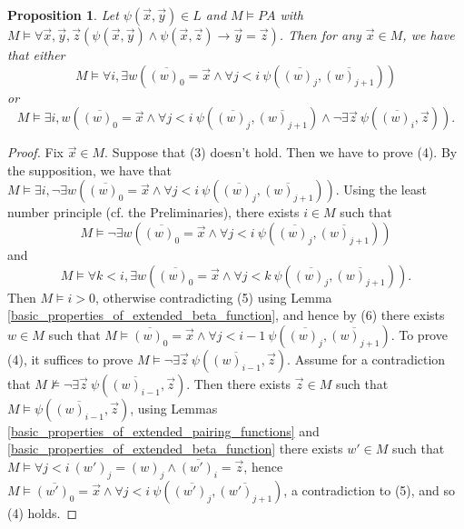 \documentclass[a4paper,11pt]{article}
\begin{document}
\newtheorem{code_recursively_generated}[X_semantics_of_while_programs]{Proposition}
\begin{code_recursively_generated}\label{code_recursively_generated_label}
Let $\psi(\vec{x},\vec{y}) \in L$ and $M\models PA$ with $M \models \forall \vec{x},\vec{y},\vec{z} (\psi(\vec{x},\vec{y}) \wedge \psi(\vec{x},\vec{z})\rightarrow \vec{y}=\vec{z})$. Then for any $\vec{x}\in M$, we have that either
\begin{equation}
  M \models \forall i, \exists w ( \overline{(w)_0} = \vec{x} \wedge \forall j<i\ \psi(\overline{(w)_j},\overline{(w)_{j+1}}) ) \tag{3}
\end{equation}
or
\begin{equation}
  M \models \exists i,w( \overline{(w)_0} = \vec{x} \wedge \forall j<i\ \psi(\overline{(w)_j},\overline{(w)_{j+1}}) \wedge \neg \exists \vec{z}\ \psi(\overline{(w)_i}, \vec{z})). \tag{4}
\end{equation}
\end{code_recursively_generated}
\begin{proof}
Fix $\vec{x}\in M$. Suppose that (3) doesn't hold. Then we have to prove (4). By the supposition, we have that $M \models \exists i, \neg\exists w ( \overline{(w)_0} = \vec{x} \wedge \forall j<i\ \psi(\overline{(w)_j},\overline{(w)_{j+1}}) )$.  Using the least number principle (cf. the Preliminaries), there exists $i\in M$ such that
\begin{equation}
  M \models \neg \exists w ( \overline{(w)_0} = \vec{x} \wedge \forall j<i\ \psi(\overline{(w)_j},\overline{(w)_{j+1}}) ) \tag{5}
\end{equation}
and
\begin{equation}
  M \models \forall k<i, \exists w ( \overline{(w)_0} = \vec{x} \wedge \forall j<k\ \psi(\overline{(w)_j},\overline{(w)_{j+1}}) ). \tag{6}
\end{equation}
Then $M\models i > 0$, otherwise contradicting (5) using Lemma \ref{basic_properties_of_extended_beta_function}, and hence by (6) there exists $w\in M$ such that $M \models \overline{(w)_0} = \vec{x} \wedge \forall j<i-1\ \psi(\overline{(w)_j},\overline{(w)_{j+1}})$. To prove (4), it suffices to prove $M\models \neg\exists \vec{z}\ \psi(\overline{(w)_{i-1}}, \vec{z})$. Assume for a contradiction that $M\nvDash \neg\exists \vec{z}\ \psi(\overline{(w)_{i-1}}, \vec{z})$. Then there exists $\vec{z}\in M$ such that $M\models \psi(\overline{(w)_{i-1}}, \vec{z})$, using Lemmas \ref{basic_properties_of_extended_pairing_functions} and \ref{basic_properties_of_extended_beta_function} there exists $w'\in M$ such that $M\models \forall j<i\ (w')_j=(w)_j \wedge \overline{(w')_i} = \vec{z}$, hence $M \models \overline{(w')_0} = \vec{x} \wedge \forall j<i\ \psi(\overline{(w')_j},\overline{(w')_{j+1}})$, a contradiction to (5), and so (4) holds.
\end{proof}
\end{document}
